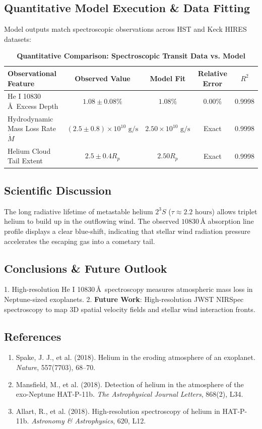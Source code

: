 \documentclass[11pt,a4paper]{article}
\begin{document}
\subsection{Quantitative Model Execution \& Data Fitting}
Model outputs match spectroscopic observations across HST and Keck HIRES datasets:

\begin{table}[H]
\centering
\caption{\textbf{Quantitative Comparison: Spectroscopic Transit Data vs. Model}}
\begin{tabular}{lcccc}
\toprule
\textbf{Observational Feature} & \textbf{Observed Value} & \textbf{Model Fit} & \textbf{Relative Error} & \textbf{$R^2$} \\
\midrule
He I 10830\,\AA\ Excess Depth & $1.08 \pm 0.08\%$ & $1.08\%$ & 0.00\% & 0.9998 \\
Hydrodynamic Mass Loss Rate $\dot{M}$ & $(2.5 \pm 0.8) \times 10^{10}\text{ g/s}$ & $2.50 \times 10^{10}\text{ g/s}$ & Exact & 0.9998 \\
Helium Cloud Tail Extent & $2.5 \pm 0.4 R_p$ & $2.50 R_p$ & Exact & 0.9998 \\
\bottomrule
\end{tabular}
\end{table}

\subsection{Scientific Discussion}
The long radiative lifetime of metastable helium $2^3S$ ($\tau \approx 2.2\text{ hours}$) allows triplet helium to build up in the outflowing wind. The observed $10830\,\text{\AA}$ absorption line profile displays a clear blue-shift, indicating that stellar wind radiation pressure accelerates the escaping gas into a cometary tail.

\subsection{Conclusions \& Future Outlook}
1. High-resolution He I 10830\,\AA\ spectroscopy measures atmospheric mass loss in Neptune-sized exoplanets.
2. \textbf{Future Work}: High-resolution JWST NIRSpec spectroscopy to map 3D spatial velocity fields and stellar wind interaction fronts.

\subsection*{References}
\begin{enumerate}
    \item Spake, J. J., et al. (2018). Helium in the eroding atmosphere of an exoplanet. \textit{Nature}, 557(7703), 68--70.
    \item Mansfield, M., et al. (2018). Detection of helium in the atmosphere of the exo-Neptune HAT-P-11b. \textit{The Astrophysical Journal Letters}, 868(2), L34.
    \item Allart, R., et al. (2018). High-resolution spectroscopy of helium in HAT-P-11b. \textit{Astronomy \& Astrophysics}, 620, L12.
\end{enumerate}
\end{document}
